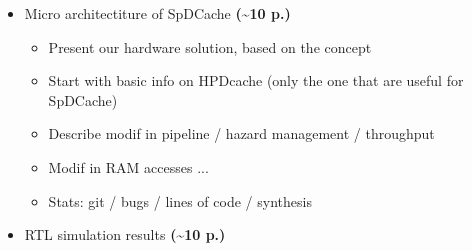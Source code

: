 \begin{itemize}
\begin{itemize}
        \item We use a GRC (no modification) for A and b -> get nb loads
        \item Show the interest of a reduction cache region for c -> REDs / reduce the number of mem accesses / link to SoA (see ASAP) \textbf{(2 p.)}
        \item We created a probabilistic model of the reduction cache which is based on the following principles ... (presented in detail in appendix n) / avantage of this model / we implemented this model in C / validation of the model with state of the art article on generic cache formalisation / introduce the graphs for the next sections \textbf{(1-2 p.)}
        \item Show that reduction cache does not handle randomness -> model graph \textbf{(1-2 p.)}
        \item Show RedC 1reg vs RedC 2reg on banded example \textbf{(2-3 p.)}
        \item Show best cache dimensions for the dense part (band) \textbf{(1 p.)}
        \item Show that sparse region (out of band) could use an other region for fine grain density (case of sub bands) -> dimensions \textbf{(1-2 p.)}
        \item Show that sparse region could use adapted HW because of the isolated elements -> dimensions \textbf{(1-2 p.)}
        \item Show how it would work with a uniform matrix -> how does it affects the dimensions \textbf{(1 p.)}
        \item Conclude on our solution and dimensioning \textbf{(1 p.)}
    \end{itemize}
    \item Micro architectiture of SpDCache \textbf{(\textasciitilde 10 p.)}
    \begin{itemize}
        \item Present our hardware solution, based on the concept
        \item Start with basic info on HPDcache (only the one that are useful for SpDCache)
        \item Describe modif in pipeline / hazard management / throughput
        \item Modif in RAM accesses ...
        \item Stats: git / bugs / lines of code / synthesis
    \end{itemize}
    \item RTL simulation results \textbf{(\textasciitilde 10 p.)}

\end{itemize}
